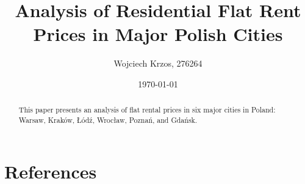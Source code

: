 \documentclass[12pt]{article}
\title{Analysis of Residential Flat Rent Prices in Major Polish Cities}
\author{Wojciech Krzos, 276264}
\date{\today}
\begin{document}
\maketitle

\tableofcontents
\newpage

\begin{abstract}
This paper presents an analysis of flat rental prices in six major cities in Poland: Warsaw, Kraków, Łódź, Wrocław, Poznań, and Gdańsk.
\end{abstract}







\section{References}




\end{document}
